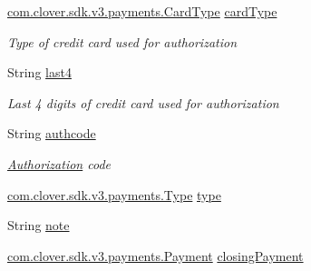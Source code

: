 \begin{DoxyCompactItemize}
\hyperlink{namespacecom_1_1clover_1_1sdk_1_1v3_1_1payments_ae544d2f27295fd15a3abb7d87bc35928}{com.\+clover.\+sdk.\+v3.\+payments.\+Card\+Type} \hyperlink{classcom_1_1clover_1_1sdk_1_1v3_1_1payments_1_1_authorization_a7e999eaa05e1a2d75c4432fca370faf6}{card\+Type}
\begin{DoxyCompactList}\small\item\em Type of credit card used for authorization \end{DoxyCompactList}\item 
String \hyperlink{classcom_1_1clover_1_1sdk_1_1v3_1_1payments_1_1_authorization_a2f971bd5b18aa303bfbda5bf104aa3f4}{last4}
\begin{DoxyCompactList}\small\item\em Last 4 digits of credit card used for authorization \end{DoxyCompactList}\item 
String \hyperlink{classcom_1_1clover_1_1sdk_1_1v3_1_1payments_1_1_authorization_af642899504fe7f2ea5ffd8a8c082075d}{authcode}
\begin{DoxyCompactList}\small\item\em \hyperlink{classcom_1_1clover_1_1sdk_1_1v3_1_1payments_1_1_authorization}{Authorization} code \end{DoxyCompactList}\item 
\hyperlink{namespacecom_1_1clover_1_1sdk_1_1v3_1_1payments_ab3a3c9595b671a87b6fe5f1920784b73}{com.\+clover.\+sdk.\+v3.\+payments.\+Type} \hyperlink{classcom_1_1clover_1_1sdk_1_1v3_1_1payments_1_1_authorization_aa8da508a44373fdaa52d69aba35bbd29}{type}
\item 
String \hyperlink{classcom_1_1clover_1_1sdk_1_1v3_1_1payments_1_1_authorization_a16934340a36f1d61da3d54f6500e26aa}{note}
\item 
\hyperlink{classcom_1_1clover_1_1sdk_1_1v3_1_1payments_1_1_payment}{com.\+clover.\+sdk.\+v3.\+payments.\+Payment} \hyperlink{classcom_1_1clover_1_1sdk_1_1v3_1_1payments_1_1_authorization_acc4d1991514fda1f720b7930273c5146}{closing\+Payment}

\end{DoxyCompactItemize}
